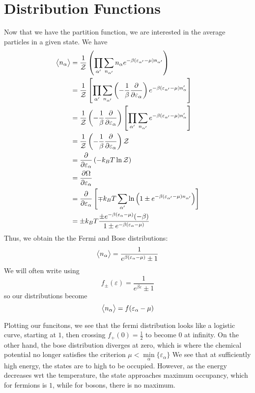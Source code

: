 \section{Distribution Functions}
Now that we have the partition function, we are interested in the average particles in a given state. We have
\begin{align*}
	\left\langle \begin{matrix}n_\alpha\end{matrix} \right\rangle&=\frac{1}{\mathcal Z}\left(\prod_{\alpha'}\sum_{n_{\alpha'}}n_{\alpha}e^{-\beta(\varepsilon_{\alpha'}-\mu)n_{\alpha'}}\right)\\
		       &=\frac{1}{\mathcal Z}\left[\prod_{\alpha'}\sum_{n_{\alpha'}}\left(-\frac{1}{\beta}\frac{\partial }{\partial \varepsilon_{\alpha}}\right)e^{-\beta( \varepsilon_{\alpha'}-\mu)n_\alpha'}\right]\\
		       &=\frac{1}{\mathcal Z}\left(-\frac{1}{\beta}\frac{\partial }{\partial \varepsilon_\alpha}\right)\left[\prod_{\alpha'}\sum_{n_{\alpha'}}e^{-\beta( \varepsilon_{\alpha'}-\mu)n_\alpha'}\right]\\
		       &=\frac{1}{\mathcal Z}\left(-\frac{1}{\beta}\frac{\partial }{\partial \varepsilon_\alpha}\right)\mathcal Z\\
		       &=\frac{\partial }{\partial \varepsilon_\alpha}\left(-k_BT\ln \mathcal Z\right)\\
		       &= \frac{\partial \Omega}{\partial \varepsilon_{\alpha}}\\
		       &= \frac{\partial }{\partial \varepsilon_{\alpha}}\left[\mp k_BT\sum_{\alpha'}\ln\left(1\pm e^{-\beta(\varepsilon_{\alpha'}-\mu)n_{\alpha'}}\right)\right]\\
		       &=\pm k_BT\frac{\pm e^{-\beta(\varepsilon_\alpha-\mu)}(-\beta)}{1\pm e^{-\beta(\varepsilon_\alpha-\mu)}}
\end{align*}
Thus, we obtain the the Fermi and Bose distributions:
\begin{equation}
	\left\langle \begin{matrix}n_\alpha\end{matrix} \right\rangle = \frac{1}{e^{\beta(\varepsilon_\alpha-\mu)}\pm 1}
\end{equation}
We will often write using
\begin{equation}
	f_\pm(\varepsilon) = \frac{1}{e^{\beta \varepsilon}\pm 1}
\end{equation}
so our distributions become
\[\left\langle \begin{matrix}n_\alpha\end{matrix} \right\rangle = f(\varepsilon_{\alpha}-\mu)\]

Plotting our funcitons, we see that the fermi distribution looks like a logistic curve, starting at \(1\), then crossing \(f_+(0)=\frac{1}{2}\) to become \(0\) at infinity. On the other hand, the bose distribution diverges at zero, which is where the chemical potential no longer satisfies the criterion \(\mu<\min\limits_\alpha\{\varepsilon_\alpha\}\) We see that at sufficiently high energy, the states are to high to be occupied. However, as the energy decreases wrt the temperature, the state approaches maximum occupancy, which for fermions is \(1\), while for bosons, there is no maximum.

